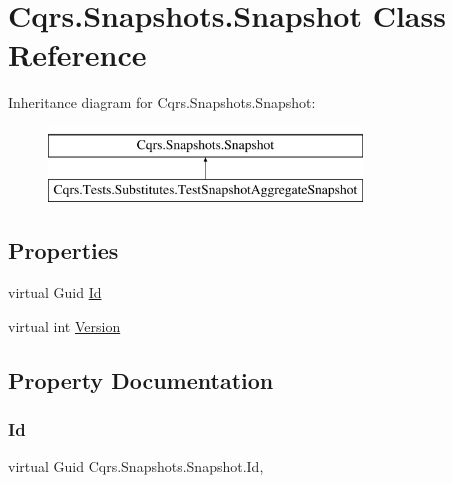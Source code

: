 \hypertarget{classCqrs_1_1Snapshots_1_1Snapshot}{}\section{Cqrs.\+Snapshots.\+Snapshot Class Reference}
\label{classCqrs_1_1Snapshots_1_1Snapshot}
Inheritance diagram for Cqrs.\+Snapshots.\+Snapshot\+:\begin{figure}[H]
\begin{center}
\leavevmode
\includegraphics[height=2.000000cm]{classCqrs_1_1Snapshots_1_1Snapshot}
\end{center}
\end{figure}
\subsection*{Properties}
\begin{DoxyCompactItemize}
\item 
virtual Guid \hyperlink{classCqrs_1_1Snapshots_1_1Snapshot_a0da54bdfa43e46a17f6e6aa88d1f3b67_a0da54bdfa43e46a17f6e6aa88d1f3b67}{Id}
\item 
virtual int \hyperlink{classCqrs_1_1Snapshots_1_1Snapshot_a59c0a399430e5f4a1b27d999c3bb5d4f_a59c0a399430e5f4a1b27d999c3bb5d4f}{Version}
\end{DoxyCompactItemize}


\subsection{Property Documentation}
\mbox{\label{classCqrs_1_1Snapshots_1_1Snapshot_a0da54bdfa43e46a17f6e6aa88d1f3b67_a0da54bdfa43e46a17f6e6aa88d1f3b67}} 
\subsubsection{\texorpdfstring{Id}{Id}}
{\footnotesize\ttfamily virtual Guid Cqrs.\+Snapshots.\+Snapshot.\+Id\hspace{0.3cm}{\ttfamily [get]}, {\ttfamily [set]}}

